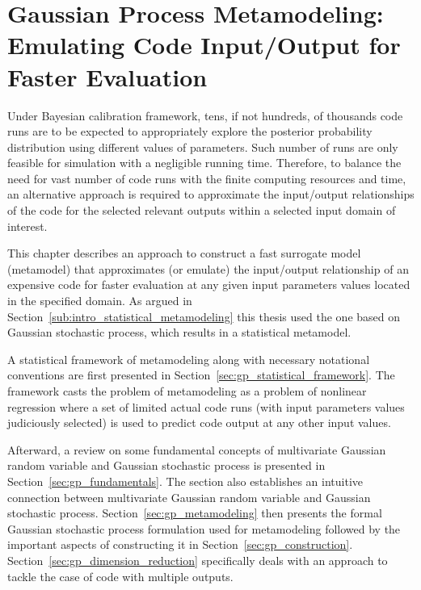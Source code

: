 \chapter[Gaussian Process Metamodeling]{Gaussian Process Metamodeling: Emulating Code Input/Output for Faster Evaluation}\label{ch:gp_metamodel}

Under Bayesian calibration framework, tens, if not hundreds, of thousands code runs are to be expected to appropriately explore the posterior probability distribution using different values of parameters.
Such number of runs are only feasible for simulation with a negligible running time.
Therefore, to balance the need for vast number of code runs with the finite computing resources and time, 
an alternative approach is required to approximate the input/output relationships of the code for the selected relevant outputs within a selected input domain of interest. 

This chapter describes an approach to construct a fast surrogate model (metamodel) that approximates (or emulate) the input/output relationship of an expensive code for faster evaluation at any given input parameters values located in the specified domain.
As argued in Section~\ref{sub:intro_statistical_metamodeling} this thesis used the one based on Gaussian stochastic process, which results in a statistical metamodel. 

A statistical framework of metamodeling along with necessary notational conventions are first presented in Section~\ref{sec:gp_statistical_framework}.
The framework casts the problem of metamodeling as a problem of nonlinear regression where a set of limited actual code runs (with input parameters values judiciously selected) is used to predict code output at any other input values.

Afterward, a review on some fundamental concepts of multivariate Gaussian random variable and Gaussian stochastic process is presented in Section~\ref{sec:gp_fundamentals}.
The section also establishes an intuitive connection between multivariate Gaussian random variable and Gaussian stochastic process.
Section~\ref{sec:gp_metamodeling} then presents the formal Gaussian stochastic process formulation used for metamodeling followed by the important aspects of constructing it in Section~\ref{sec:gp_construction}.
Section~\ref{sec:gp_dimension_reduction} specifically deals with an approach to tackle the case of code with multiple outputs.


